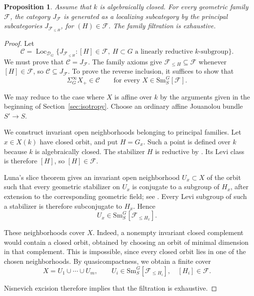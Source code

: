 \documentclass[11pt,reqno]{amsart}
\newtheorem{proposition}[theorem]{Proposition}
\theoremstyle{definition}
\theoremstyle{remark}
\theoremstyle{plain}
\numberwithin{equation}{section}
\newcommand{\Sm}{\mathrm{Sm}}
\newcommand{\D}{\mathcal D}
\newcommand{\F}{\mathcal F}
\begin{document}
\begin{proposition}\label{prop:family-generation}
Assume that \(k\) is algebraically closed.
For every geometric family \(\F\), the category \(J_\F\) is
generated as a localizing subcategory by the principal
subcategories \(J_{\F_{\leq H}}\), for \((H)\in\F\).
The family filtration is exhaustive.
\end{proposition}

\begin{proof}


Let
\[
 \mathcal C=
 \operatorname{Loc}_{\D_G}
 \bigl\{J_{\F_{\leq H}}:[H]\in\F,\ H\subset G
 \text{ a linearly reductive }k\text{-subgroup}\bigr\}.
\]
We must prove that \(\mathcal C=J_\F\).
The family axioms give \(\F_{\leq H}\subseteq\F\) whenever
\([H]\in\F\), so \(\mathcal C\subseteq J_\F\).
To prove the reverse inclusion, it suffices to show that
\[
 \Sigma^\infty_G X_+\in\mathcal C
 \qquad\text{for every }X\in\Sm^G_S[\F].
\]

We may reduce to the case where \(X\) is affine over \(k\)
by the arguments given in the beginning of Section~\ref{sec:isotropy}.
Choose an ordinary affine Jouanolou bundle \(S'\to S\).

We construct invariant open neighborhoods belonging to
principal families.
Let \(x\in X(k)\) have closed orbit, and put \(H=G_x\).
Such a point is defined over \(k\) because \(k\) is algebraically closed.
The stabilizer \(H\) is reductive by
\cite[I.2, Proposition]{Luna}.
Its Levi class is therefore \([H]\), so \([H]\in\F\).

Luna's slice theorem gives an invariant open neighborhood
\(U_x\subset X\) of the orbit such that every geometric
stabilizer on \(U_x\) is conjugate to a subgroup of \(H_x\),
after extension to the corresponding geometric field;
see \cite[III.1, Theorem and Remark~4, pp.~97--98]{Luna}.
Every Levi subgroup of such a stabilizer is therefore
subconjugate to \(H_x\).
Hence
\[
 U_x\in\Sm^G_S[\F_{\leq H_x}].
\]

These neighborhoods cover \(X\).
Indeed, a nonempty invariant closed complement would contain
a closed orbit, obtained by choosing an orbit of minimal
dimension in that complement.
This is impossible, since every closed orbit lies in one
of the chosen neighborhoods.
By quasicompactness, we obtain a finite cover
\[
 X=U_1\cup\cdots\cup U_m,
 \qquad
 U_i\in\Sm^G_S[\F_{\leq H_i}],
 \quad [H_i]\in\F.
\]

Nisnevich excision therefore implies that the filtration is exhaustive.
\end{proof}
\end{document}
